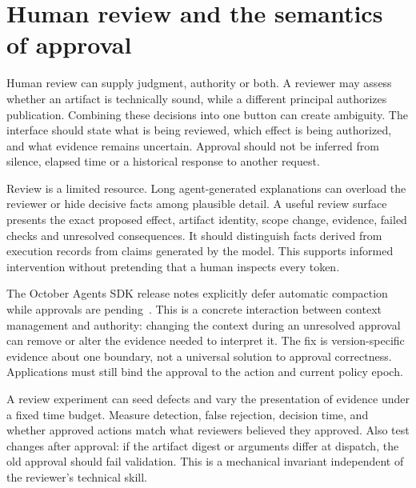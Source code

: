 \section{Human review and the semantics of approval}\label{sec:C29:review}
Human review can supply judgment, authority or both. A reviewer may assess whether an artifact is technically sound, while a different principal authorizes publication. Combining these decisions into one button can create ambiguity. The interface should state what is being reviewed, which effect is being authorized, and what evidence remains uncertain. Approval should not be inferred from silence, elapsed time or a historical response to another request.

Review is a limited resource. Long agent-generated explanations can overload the reviewer or hide decisive facts among plausible detail. A useful review surface presents the exact proposed effect, artifact identity, scope change, evidence, failed checks and unresolved consequences. It should distinguish facts derived from execution records from claims generated by the model. This supports informed intervention without pretending that a human inspects every token.

The October Agents SDK release notes explicitly defer automatic compaction while approvals are pending~\cite{executionrelease02}. This is a concrete interaction between context management and authority: changing the context during an unresolved approval can remove or alter the evidence needed to interpret it. The fix is version-specific evidence about one boundary, not a universal solution to approval correctness. Applications must still bind the approval to the action and current policy epoch.

A review experiment can seed defects and vary the presentation of evidence under a fixed time budget. Measure detection, false rejection, decision time, and whether approved actions match what reviewers believed they approved. Also test changes after approval: if the artifact digest or arguments differ at dispatch, the old approval should fail validation. This is a mechanical invariant independent of the reviewer's technical skill.

